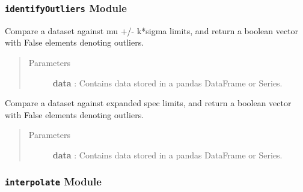\documentclass[letterpaper,10pt,english]{sphinxmanual}
\begin{document}
\subsubsection{\texttt{identifyOutliers} Module}
\label{qikify.controllers:module-qikify.controllers.identifyOutliers}\label{qikify.controllers:identifyoutliers-module}

\begin{fulllineitems}
\label{qikify.controllers:qikify.controllers.identifyOutliers.identifyOutliers}
Compare a dataset against mu +/- k*sigma limits, and
return a boolean vector with False elements denoting outliers.
\begin{quote}\begin{description}
\item[{Parameters }] \leavevmode
\textbf{data} : Contains data stored in a pandas DataFrame or Series.

\end{description}\end{quote}

\end{fulllineitems}


\begin{fulllineitems}
\label{qikify.controllers:qikify.controllers.identifyOutliers.identifyOutliersSpecs}
Compare a dataset against expanded spec limits, and
return a boolean vector with False elements denoting outliers.
\begin{quote}\begin{description}
\item[{Parameters }] \leavevmode
\textbf{data} : Contains data stored in a pandas DataFrame or Series.

\end{description}\end{quote}

\end{fulllineitems}



\subsubsection{\texttt{interpolate} Module}
\label{qikify.controllers:module-qikify.controllers.interpolate}\label{qikify.controllers:interpolate-module}
\end{document}
